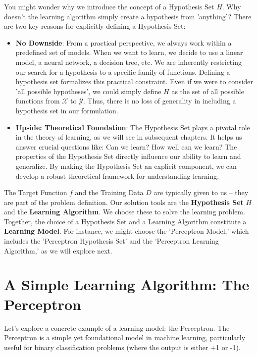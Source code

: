 \documentclass{article}
\begin{document}
You might wonder why we introduce the concept of a Hypothesis Set \(H\). Why doesn't the learning algorithm simply create a hypothesis from 'anything'?  There are two key reasons for explicitly defining a Hypothesis Set:

\begin{itemize}
    \item \textbf{No Downside}: From a practical perspective, we always work within a predefined set of models.  When we want to learn, we decide to use a linear model, a neural network, a decision tree, etc.  We are inherently restricting our search for a hypothesis to a specific family of functions.  Defining a hypothesis set formalizes this practical constraint. Even if we were to consider 'all possible hypotheses', we could simply define \(H\) as the set of all possible functions from \(\mathcal{X}\) to \(\mathcal{Y}\).  Thus, there is no loss of generality in including a hypothesis set in our formulation.

    \item \textbf{Upside: Theoretical Foundation}: The Hypothesis Set plays a pivotal role in the theory of learning, as we will see in subsequent chapters. It helps us answer crucial questions like: Can we learn? How well can we learn?  The properties of the Hypothesis Set directly influence our ability to learn and generalize.  By making the Hypothesis Set an explicit component, we can develop a robust theoretical framework for understanding learning.
\end{itemize}

The Target Function \(f\) and the Training Data \(D\) are typically given to us – they are part of the problem definition. Our solution tools are the \textbf{Hypothesis Set} \(H\) and the \textbf{Learning Algorithm}. We choose these to solve the learning problem.  Together, the choice of a Hypothesis Set and a Learning Algorithm constitute a \textbf{Learning Model}. For instance, we might choose the 'Perceptron Model,' which includes the 'Perceptron Hypothesis Set' and the 'Perceptron Learning Algorithm,' as we will explore next.

\section{A Simple Learning Algorithm: The Perceptron}

Let's explore a concrete example of a learning model: the Perceptron.  The Perceptron is a simple yet foundational model in machine learning, particularly useful for binary classification problems (where the output is either +1 or -1).
\end{document}
